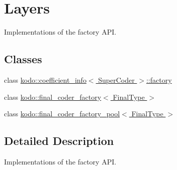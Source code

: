 \hypertarget{group__factory__layers}{\section{Layers}
\label{group__factory__layers}
}


Implementations of the factory A\-P\-I.  


\subsection*{Classes}
\begin{DoxyCompactItemize}
\item 
class \hyperlink{classkodo_1_1coefficient__info_1_1factory}{kodo\-::coefficient\-\_\-info$<$ Super\-Coder $>$\-::factory}
\item 
class \hyperlink{classkodo_1_1final__coder__factory}{kodo\-::final\-\_\-coder\-\_\-factory$<$ Final\-Type $>$}
\item 
class \hyperlink{classkodo_1_1final__coder__factory__pool}{kodo\-::final\-\_\-coder\-\_\-factory\-\_\-pool$<$ Final\-Type $>$}
\end{DoxyCompactItemize}


\subsection{Detailed Description}
Implementations of the factory A\-P\-I. 